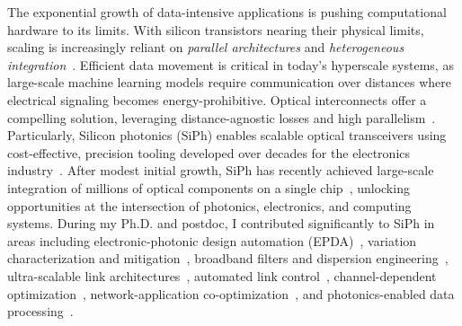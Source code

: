 The exponential growth of data-intensive applications is pushing computational hardware to its limits. With silicon transistors nearing their physical limits, scaling is increasingly reliant on \emph{parallel architectures} and \emph{heterogeneous integration}~\cite{iyerHeterogeneousIntegrationPerformance2016}. Efficient data movement is critical in today's hyperscale systems, as large-scale machine learning models require communication over distances where electrical signaling becomes energy-prohibitive. Optical interconnects offer a compelling solution, leveraging distance-agnostic losses and high parallelism~\cite{millerRationaleChallengesOptical2000}. Particularly, Silicon photonics (SiPh) enables scalable optical transceivers using cost-effective, precision tooling developed over decades for the electronics industry~\cite{sorefPresentFutureSilicon2006}. After modest initial growth, SiPh has recently achieved large-scale integration of millions of optical components on a single chip~\cite{shekharRoadmappingNextGeneration2024}, unlocking opportunities at the intersection of photonics, electronics, and computing systems. During my Ph.D. and postdoc, I contributed significantly to SiPh in areas including electronic-photonic design automation (EPDA)~\cite{wuCompactModelingCircuitlevel2017,zhangCompactModelingSilicon2017,jamesFlexibleProcessAwareCompact2022,jamesProcessVariationAwareCompact2023a}, variation characterization and mitigation~\cite{wuPairingMicroringbasedSilicon2018,wangEnergyefficientChannelAlignment2018,wangTamingEmergingDevices2019,wangBidirectionalTuningMicroringbased2019,wangCharacterizationApplicationsSpatial2020,wangEnergyEfficiencyYield2021}, broadband filters and dispersion engineering~\cite{wangDispersionEngineeredFabricationRobustSOI2023,wangIntegratedCompactTunable2023,parsonsOFC25}, ultra-scalable link architectures~\cite{wangScalableArchitectureSubpJ2023,novickHighbandwidthDensitySilicon2023}, automated link control~\cite{wangAutomatedTuningRingAssisted2024,wangInterleaverTuning,wangOFC25}, channel-dependent optimization~\cite{novickIntegratedPhotonicResonant2024,gopalEqualization2024}, network-application co-optimization~\cite{wangTaskMappingAssistedLaser2019,wangTrafficAdaptivePowerReconfiguration2021,michelogiannakisEfficientIntraRackResource2023,wuWavelengthReconfigurableTransceiver2024,wuFlexibleSiliconPhotonic2024}, and photonics-enabled data processing~\cite{naumanOFC25,zypmanDSP}.

